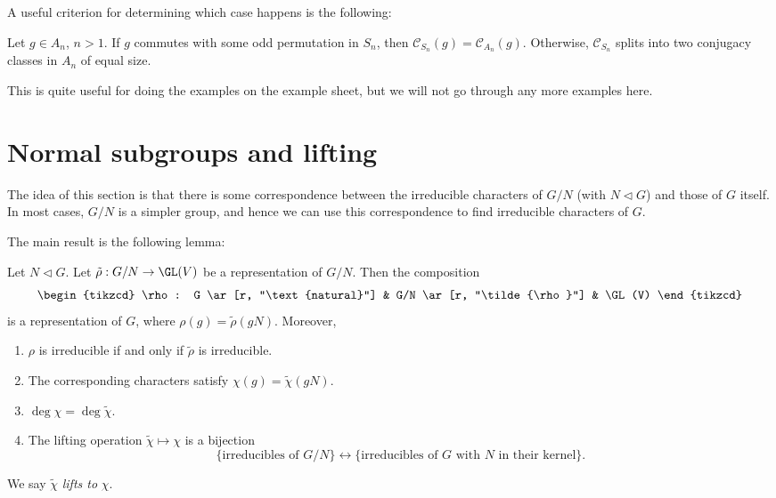 \documentclass[a4paper]{article}
\begin{document}
A useful criterion for determining which case happens is the following:

\begin{lemma}
  Let $g \in A_n$, $n > 1$. If $g$ commutes with some odd permutation in $S_n$, then $\mathcal{C}_{S_n}(g) = \mathcal{C}_{A_n}(g)$. Otherwise, $\mathcal{C}_{S_n}$ splits into two conjugacy classes in $A_n$ of equal size.
\end{lemma}

This is quite useful for doing the examples on the example sheet, but we will not go through any more examples here.

\section{Normal subgroups and lifting}
The idea of this section is that there is some correspondence between the irreducible characters of $G/N$ (with $N \lhd G$) and those of $G$ itself. In most cases, $G/N$ is a simpler group, and hence we can use this correspondence to find irreducible characters of $G$.

The main result is the following lemma:

\begin{lemma}
  Let $N \lhd G$. Let $\tilde{\rho}: G/N \to \GL(V)$ be a representation of $G/N$. Then the composition
  \[
    \begin{tikzcd}
      \rho: G \ar[r, "\text{natural}"] & G/N \ar[r, "\tilde{\rho}"] & \GL(V)
    \end{tikzcd}
  \]
  is a representation of $G$, where $\rho(g) = \tilde{\rho}(gN)$. Moreover,
  \begin{enumerate}
    \item $\rho$ is irreducible if and only if $\tilde{\rho}$ is irreducible.
    \item The corresponding characters satisfy $\chi(g) = \tilde{\chi}(gN)$.
    \item $\deg \chi = \deg \tilde{\chi}$.
    \item The lifting operation $\tilde{\chi} \mapsto \chi$ is a bijection
      \[
        \{\text{irreducibles of }G/N\} \longleftrightarrow \{\text{irreducibles of $G$ with $N$ in their kernel}\}.
      \]
  \end{enumerate}
  We say $\tilde{\chi}$ \emph{lifts to} $\chi$.
\end{lemma}
\end{document}
